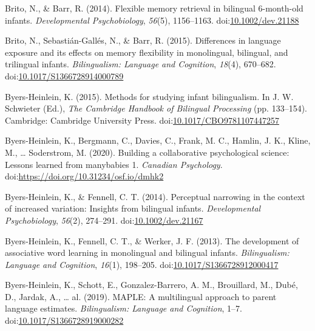 \documentclass[,man,floatsintext]{apa6}
\begin{document}
\leavevmode\hypertarget{ref-brito_2014}{}%
Brito, N., \& Barr, R. (2014). Flexible memory retrieval in bilingual 6-month-old infants. \emph{Developmental Psychobiology}, \emph{56}(5), 1156--1163. doi:\href{https://doi.org/10.1002/dev.21188}{10.1002/dev.21188}

\leavevmode\hypertarget{ref-brito_2015}{}%
Brito, N., Sebastián-Gallés, N., \& Barr, R. (2015). Differences in language exposure and its effects on memory flexibility in monolingual, bilingual, and trilingual infants. \emph{Bilingualism: Language and Cognition}, \emph{18}(4), 670--682. doi:\href{https://doi.org/10.1017/S1366728914000789}{10.1017/S1366728914000789}

\leavevmode\hypertarget{ref-byers_heinlein_2015}{}%
Byers-Heinlein, K. (2015). Methods for studying infant bilingualism. In J. W. Schwieter (Ed.), \emph{The Cambridge Handbook of Bilingual Processing} (pp. 133--154). Cambridge: Cambridge University Press. doi:\href{https://doi.org/10.1017/CBO9781107447257}{10.1017/CBO9781107447257}

\leavevmode\hypertarget{ref-byers_heinlein_et_al_2019}{}%
Byers-Heinlein, K., Bergmann, C., Davies, C., Frank, M. C., Hamlin, J. K., Kline, M., \ldots{} Soderstrom, M. (2020). Building a collaborative psychological science: Lessons learned from manybabies 1. \emph{Canadian Psychology}. doi:\href{https://doi.org/https://doi.org/10.31234/osf.io/dmhk2}{https://doi.org/10.31234/osf.io/dmhk2}

\leavevmode\hypertarget{ref-byers_heinlein_2014}{}%
Byers-Heinlein, K., \& Fennell, C. T. (2014). Perceptual narrowing in the context of increased variation: Insights from bilingual infants. \emph{Developmental Psychobiology}, \emph{56}(2), 274--291. doi:\href{https://doi.org/10.1002/dev.21167}{10.1002/dev.21167}

\leavevmode\hypertarget{ref-byers_heinlein_2013}{}%
Byers-Heinlein, K., Fennell, C. T., \& Werker, J. F. (2013). The development of associative word learning in monolingual and bilingual infants. \emph{Bilingualism: Language and Cognition}, \emph{16}(1), 198--205. doi:\href{https://doi.org/10.1017/S1366728912000417}{10.1017/S1366728912000417}

\leavevmode\hypertarget{ref-byers_heinlein_2019}{}%
Byers-Heinlein, K., Schott, E., Gonzalez-Barrero, A. M., Brouillard, M., Dubé, D., Jardak, A., \ldots{} al. (2019). MAPLE: A multilingual approach to parent language estimates. \emph{Bilingualism: Language and Cognition}, 1--7. doi:\href{https://doi.org/10.1017/S1366728919000282}{10.1017/S1366728919000282}
\end{document}
